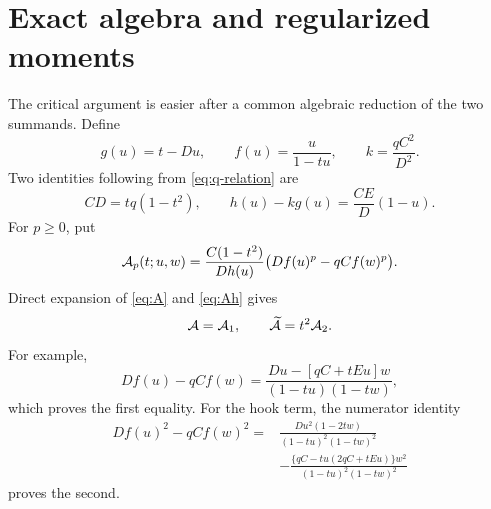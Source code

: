 \documentclass[11pt]{article}
\theoremstyle{definition}
\theoremstyle{remark}
\begin{document}
\section{Exact algebra and regularized moments}\label{sec:algebra}

The critical argument is easier after a common algebraic reduction of the
two summands.  Define
\[
  g(u)=t-Du,\qquad
  f(u)=\frac{u}{1-tu},\qquad
  k=\frac{qC^2}{D^2}.
\]
Two identities following from \eqref{eq:q-relation} are
\begin{equation}\label{eq:CD}
  CD=tq(1-t^2),
  \qquad
  h(u)-kg(u)=\frac{CE}{D}(1-u).
\end{equation}
For \(p\geq0\), put
\[
  {\cal A}_p(t;u,w)
   =\frac{C(1-t^2)}{Dh(u)}
     \bigl(Df(u)^p-qC f(w)^p\bigr).
\]
Direct expansion of \eqref{eq:A} and \eqref{eq:Ah} gives
\begin{equation}\label{eq:Ap}
  {\cal A}={\cal A}_1,
  \qquad
  \widetilde{\cal A}=t^2{\cal A}_2.
\end{equation}
For example,
\[
 Df(u)-qCf(w)
 =\frac{Du-[qC+tEu]w}{(1-tu)(1-tw)},
\]
which proves the first equality.  For the hook term, the numerator identity
\[
\begin{aligned}
 Df(u)^2-qCf(w)^2
={}&
 \frac{Du^2(1-2tw)}{(1-tu)^2(1-tw)^2}\\
&-
 \frac{\{qC-tu(2qC+tEu)\}w^2}
 {(1-tu)^2(1-tw)^2}
\end{aligned}
\]
proves the second.
\end{document}
